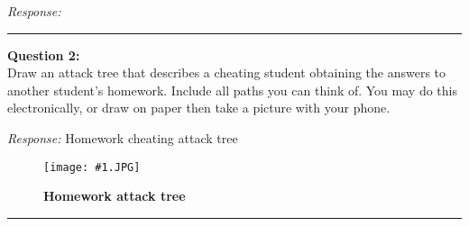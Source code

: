 \documentclass[a4paper, 11pt]{article}
\newenvironment{problem}[2][Question]
               { \begin{mdframed}[backgroundcolor=gray!20] \textbf{#1 #2:} \\}
               {   \end{mdframed}}
\newenvironment{response}
                {\textit{Response:}}
                {}
\newcommand*{\img}[2]{
   \begin{figure}[!ht]
     \flushleft
     \texttt{[image: \#1.JPG]}
     \caption{\bf #2}
     \label{fig:#1}
 \end{figure}}
\begin{document}
\begin{response}
 \end{response}
 \noindent\rule{7in}{2.8pt}

 \begin{problem}{2} 

   Draw an attack tree that describes a cheating student obtaining the answers to another student’s homework.  Include all paths you can think of.  You may do this electronically, or draw on paper then take a picture with your phone.
 \end{problem}

 \begin{response}
   Homework cheating attack tree \\
   \img{Threat-tree}{Homework attack tree}
 \end{response}
 \noindent\rule{7in}{2.8pt}
 
\end{document}
